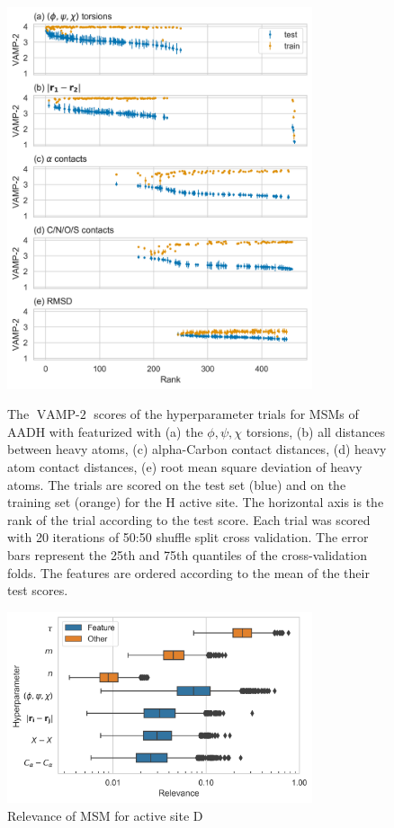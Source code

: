 \begin{figure}
    \centering
    \caption{The $\operatorname{VAMP-2}$ scores of the hyperparameter trials for MSMs of AADH with featurized with (a) the $\phi, \psi, \chi$ torsions, (b) all distances between heavy atoms, (c) alpha-Carbon contact distances, (d) heavy atom contact distances, (e) root mean square deviation of heavy atoms. The trials are scored on the test set (blue) and on the training set (orange) for the H active site. The horizontal axis is the rank of the trial according to the test score. Each trial was scored with 20 iterations of 50:50 shuffle split cross validation. The error bars represent the 25th and 75th quantiles of the cross-validation folds. The features are ordered according to the mean of the their test scores.}
    \includegraphics[width=0.8\textwidth]{chapters/msm_optimization/figures/aadh_train_test_results.png}
    \label{fig:aad_train_test}
\end{figure}


\begin{figure}
    \centering
    \includegraphics[width=0.8\textwidth]{chapters/msm_optimization/figures/AADH_relevance_d.png}
    \caption{Relevance of MSM for active site D}
    \label{fig:aadh_d_relevance}
\end{figure}

